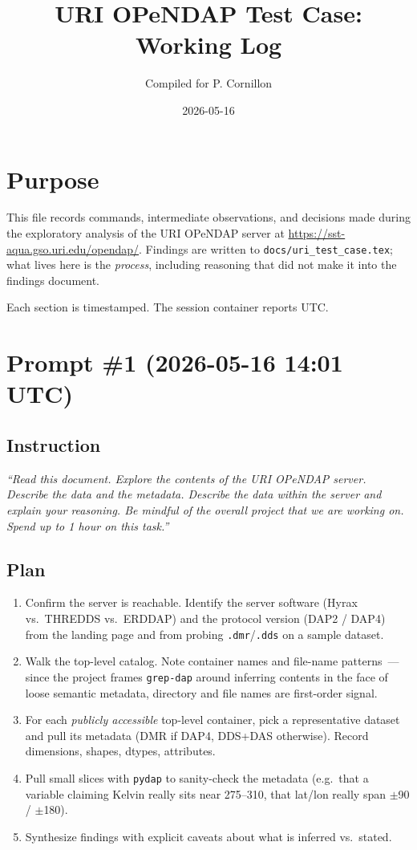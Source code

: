 \documentclass[11pt]{article}
\title{URI OPeNDAP Test Case: Working Log}
\author{Compiled for P. Cornillon}
\date{2026-05-16}
\begin{document}
\maketitle

\section*{Purpose}

This file records commands, intermediate observations, and decisions
made during the exploratory analysis of the URI OPeNDAP server at
\url{https://sst-aqua.gso.uri.edu/opendap/}. Findings are written to
\texttt{docs/uri\_test\_case.tex}; what lives here is the
\emph{process}, including reasoning that did not make it into the
findings document.

Each section is timestamped. The session container reports UTC.

\section{Prompt \#1 (2026-05-16 14:01 UTC)}

\subsection{Instruction}

\emph{``Read this document. Explore the contents of the URI OPeNDAP
server. Describe the data and the metadata. Describe the data within
the server and explain your reasoning. Be mindful of the overall
project that we are working on. Spend up to 1 hour on this task.''}

\subsection{Plan}

\begin{enumerate}
  \item Confirm the server is reachable. Identify the server software
    (Hyrax vs.\ THREDDS vs.\ ERDDAP) and the protocol version (DAP2 /
    DAP4) from the landing page and from probing
    \texttt{.dmr}/\texttt{.dds} on a sample dataset.
  \item Walk the top-level catalog. Note container names and
    file-name patterns~--- since the project frames \texttt{grep-dap}
    around inferring contents in the face of loose semantic
    metadata, directory and file names are first-order signal.
  \item For each \emph{publicly accessible} top-level container,
    pick a representative dataset and pull its metadata (DMR if
    DAP4, DDS+DAS otherwise). Record dimensions, shapes, dtypes,
    attributes.
  \item Pull small slices with \texttt{pydap} to sanity-check the
    metadata (e.g.\ that a variable claiming Kelvin really sits near
    275--310, that lat/lon really span $\pm$90 / $\pm$180).
  \item Synthesize findings with explicit caveats about what is
    inferred vs.\ stated.
\end{enumerate}
\end{document}
